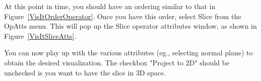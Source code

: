 

\begin{figure}
  \vspace{-100pt}
  \centering 
  \hspace{50pts}
  \caption{}
  \label{}
\end{figure}


\begin{figure}
  \centering
  \vspace{-20pt}
  \hspace{50pt}
  \caption{}
  \label{}
\end{figure}


At this point in time, you should have an ordering similar to that in
Figure~\ref{VisItOrderOperator}.  Once you have this order, select
Slice from the OpAtts menu. This will pop up the Slice operator
attributes window, as shown in Figure~\ref{VisItSliceAtts}.


You can now play up with the various attributes (eg., selecting normal
plane) to obtain the desired visualization. The checkbox "Project to
2D" should be unchecked is you want to have the slice in 3D space.

